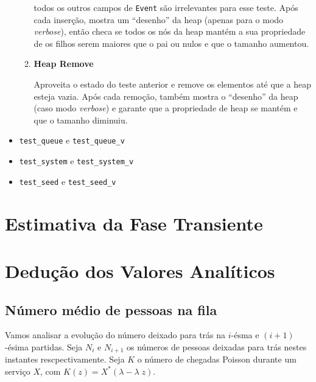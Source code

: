 \documentclass[a4paper]{article}
\newcommand{\inlcode}{\texttt}
\begin{document}
\begin{itemize}
\begin{enumerate}
                todos os outros campos de \inlcode{Event}
                são irrelevantes para esse teste.
                Após cada inserção, mostra um ``desenho'' da heap
                (apenas para o modo \emph{verbose}),
                então checa se todos os nós da heap mantém
                a sua propriedade de os filhos serem maiores
                que o pai ou nulos
                e que o tamanho aumentou.
            \item \textbf{Heap Remove} \par
                Aproveita o estado do teste anterior
                e remove os elementos até que a heap esteja vazia.
                Após cada remoção, também
                mostra o ``desenho'' da heap
                (caso modo \emph{verbose})
                e garante que a propriedade de heap se mantém
                e que o tamanho diminuiu.
        \end{enumerate}
    \item \inlcode{test\_queue} e \inlcode{test\_queue\_v}
    \item \inlcode{test\_system} e \inlcode{test\_system\_v}
    \item \inlcode{test\_seed} e \inlcode{test\_seed\_v}
\end{itemize}

\newpage
\section{Estimativa da Fase Transiente}

\newpage
\section{Dedução dos Valores Analíticos}
\subsection{Número médio de pessoas na fila}
Vamos analisar a evolução do número
deixado para trás na \(i\)-ésma e \((i+1)\)-ésima partidas.
Seja \(N_i\) e  \(N_{i+1}\) os números de pessoas
deixadas para trás nestes instantes rescpectivamente.
Seja \(K\) o número de chegadas Poisson
durante um serviço \(X\),
com \(K(z) = X^*(\lambda - \lambda \; z)\).
\end{document}
